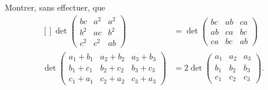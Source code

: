 \begin{exercice}\label{exoLineraire0030}

	Montrer, sans effectuer, que
	\begin{equation}
		\begin{aligned}[]
			\det\begin{pmatrix}
				  bc		&	a^2	&	a^2\\ 
				    b^2		&	ac	&	b^2\\ 
				     c^2	&	c^2	& 	ab	  
			     \end{pmatrix}&=
			     \det\begin{pmatrix}
				       bc	&	ab	&	ca\\ 
				         ab	&	ca	&	bc\\ 
					  ca	&	bc	& ab	  
				  \end{pmatrix}\\
			\det\begin{pmatrix}
				  a_1+b_1	&	a_2+b_2	&	a_3+b_3\\ 
				    b_1+c_1	&	b_2+c_2	&	b_3+c_3\\ 
				     c_1+a_1	&	c_2+a_2	& c_3+a_3	  
			     \end{pmatrix}&=2
			     \det\begin{pmatrix}
				       a_1	&	a_2	&	a_3\\ 
				         b_1	&	b_2	&	b_3\\ 
					  c_1	&	c_2	& c_3	  
				  \end{pmatrix}.
		\end{aligned}
	\end{equation}

\end{exercice}
